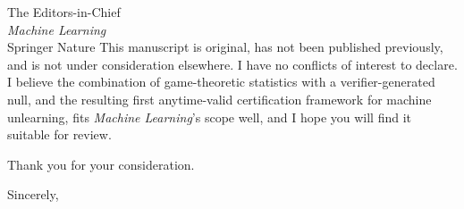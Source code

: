 \documentclass[10pt,a4paper]{letter}
\begin{document}
\begin{letter}{The Editors-in-Chief\\\emph{Machine Learning}\\Springer Nature}
This manuscript is original, has not been published previously, and is not under
consideration elsewhere. I have no conflicts of interest to declare. I believe the
combination of game-theoretic statistics with a verifier-generated null, and the
resulting first anytime-valid certification framework for machine unlearning,
fits \emph{Machine Learning}'s scope well, and I hope you will find it suitable
for review.

Thank you for your consideration.

\closing{Sincerely,}

\end{letter}
\end{document}
